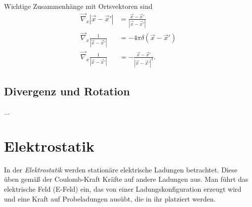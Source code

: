 \documentclass{article}
\begin{document}
Wichtige Zusammenhänge mit Ortsvektoren sind
	\begin{align}
		\vec{\nabla}_x |\vec{x} - \vec{x}'| &= \frac{\vec{x} - \vec{x}'}{|\vec{x} - \vec{x}'|} \\
		\vec{\nabla}_x \frac{1}{|\vec{x} - \vec{x}'|} &= -4\pi \delta(\vec{x} - \vec{x}') \\
		\vec{\nabla}_x \frac{1}{|\vec{x} - \vec{x}'|} &= -\frac{\vec{x} - \vec{x}'}{|\vec{x} - \vec{x}'|^3}.
	\end{align}


\subsection{Divergenz und Rotation}
...


\newpage


\section{Elektrostatik}
In der \textit{Elektrostatik} werden stationäre elektrische Ladungen betrachtet. Diese üben gemäß der Coulomb-Kraft Kräfte auf andere Ladungen aus. Man führt das elektrische Feld (E-Feld) ein, das von einer Ladungskonfiguration erzeugt wird und eine Kraft auf Probeladungen ausübt, die in ihr platziert werden.
\end{document}
